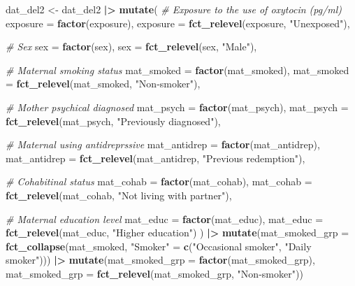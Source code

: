 \documentclass[
]{article}
\newenvironment{Shaded}{\begin{snugshade}}{\end{snugshade}}
\newcommand{\AttributeTok}[1]{\textcolor[rgb]{0.13,0.29,0.53}{#1}}
\newcommand{\CommentTok}[1]{\textcolor[rgb]{0.56,0.35,0.01}{\textit{#1}}}
\newcommand{\FunctionTok}[1]{\textcolor[rgb]{0.13,0.29,0.53}{\textbf{#1}}}
\newcommand{\NormalTok}[1]{#1}
\newcommand{\OtherTok}[1]{\textcolor[rgb]{0.56,0.35,0.01}{#1}}
\newcommand{\SpecialCharTok}[1]{\textcolor[rgb]{0.81,0.36,0.00}{\textbf{#1}}}
\newcommand{\StringTok}[1]{\textcolor[rgb]{0.31,0.60,0.02}{#1}}
\begin{document}
\begin{Shaded}
\begin{Highlighting}[]
\NormalTok{dat\_del2 }\OtherTok{\textless{}{-}}\NormalTok{ dat\_del2 }\SpecialCharTok{|\textgreater{}} 
  \FunctionTok{mutate}\NormalTok{(}
    \CommentTok{\# Exposure to the use of oxytocin (pg/ml)}
    \AttributeTok{exposure =} \FunctionTok{factor}\NormalTok{(exposure),}
    \AttributeTok{exposure =} \FunctionTok{fct\_relevel}\NormalTok{(exposure, }\StringTok{"Unexposed"}\NormalTok{),}
    
    \CommentTok{\# Sex     }
    \AttributeTok{sex =} \FunctionTok{factor}\NormalTok{(sex),}
    \AttributeTok{sex =} \FunctionTok{fct\_relevel}\NormalTok{(sex, }\StringTok{"Male"}\NormalTok{),}
    
    \CommentTok{\# Maternal smoking status     }
    \AttributeTok{mat\_smoked =} \FunctionTok{factor}\NormalTok{(mat\_smoked),}
    \AttributeTok{mat\_smoked =} \FunctionTok{fct\_relevel}\NormalTok{(mat\_smoked, }\StringTok{"Non{-}smoker"}\NormalTok{),}
    
    \CommentTok{\# Mother psychical diagnosed     }
    \AttributeTok{mat\_psych =} \FunctionTok{factor}\NormalTok{(mat\_psych),}
    \AttributeTok{mat\_psych =} \FunctionTok{fct\_relevel}\NormalTok{(mat\_psych, }\StringTok{"Previously diagnosed"}\NormalTok{),}
    
    \CommentTok{\# Maternal using antidreprssive     }
    \AttributeTok{mat\_antidrep =} \FunctionTok{factor}\NormalTok{(mat\_antidrep),}
    \AttributeTok{mat\_antidrep =} \FunctionTok{fct\_relevel}\NormalTok{(mat\_antidrep, }\StringTok{"Previous redemption"}\NormalTok{),}
    
    \CommentTok{\# Cohabitinal status     }
    \AttributeTok{mat\_cohab =} \FunctionTok{factor}\NormalTok{(mat\_cohab),}
    \AttributeTok{mat\_cohab =} \FunctionTok{fct\_relevel}\NormalTok{(mat\_cohab, }\StringTok{"Not living with partner"}\NormalTok{),}
    
    \CommentTok{\# Maternal education level     }
    \AttributeTok{mat\_educ =} \FunctionTok{factor}\NormalTok{(mat\_educ),}
    \AttributeTok{mat\_educ =} \FunctionTok{fct\_relevel}\NormalTok{(mat\_educ, }\StringTok{"Higher education"}\NormalTok{)}
\NormalTok{    ) }\SpecialCharTok{|\textgreater{}} 
  \FunctionTok{mutate}\NormalTok{(}\AttributeTok{mat\_smoked\_grp =} \FunctionTok{fct\_collapse}\NormalTok{(mat\_smoked,}
                                       \StringTok{"Smoker"} \OtherTok{=} \FunctionTok{c}\NormalTok{(}\StringTok{"Occasional smoker"}\NormalTok{, }\StringTok{"Daily smoker"}\NormalTok{))) }\SpecialCharTok{|\textgreater{}} 
  \FunctionTok{mutate}\NormalTok{(}\AttributeTok{mat\_smoked\_grp =} \FunctionTok{factor}\NormalTok{(mat\_smoked\_grp),}
         \AttributeTok{mat\_smoked\_grp =} \FunctionTok{fct\_relevel}\NormalTok{(mat\_smoked\_grp, }\StringTok{"Non{-}smoker"}\NormalTok{))}
\end{Highlighting}
\end{Shaded}
\end{document}

